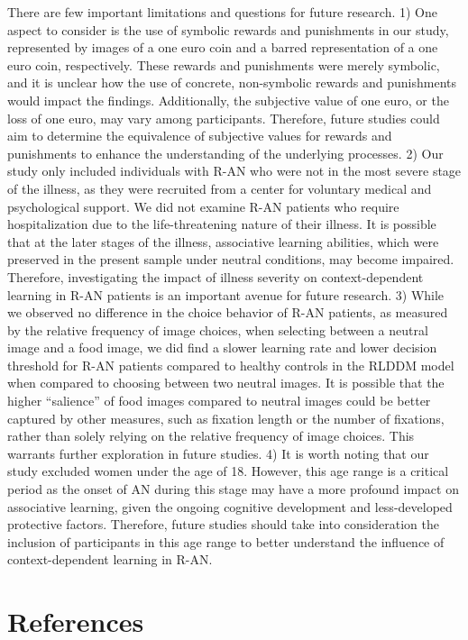 \documentclass[
  man,floatsintext]{apa6}
\begin{document}
There are few important limitations and questions for future research. 1) One aspect to consider is the use of symbolic rewards and punishments in our study, represented by images of a one euro coin and a barred representation of a one euro coin, respectively. These rewards and punishments were merely symbolic, and it is unclear how the use of concrete, non-symbolic rewards and punishments would impact the findings. Additionally, the subjective value of one euro, or the loss of one euro, may vary among participants. Therefore, future studies could aim to determine the equivalence of subjective values for rewards and punishments to enhance the understanding of the underlying processes. 2) Our study only included individuals with R-AN who were not in the most severe stage of the illness, as they were recruited from a center for voluntary medical and psychological support. We did not examine R-AN patients who require hospitalization due to the life-threatening nature of their illness. It is possible that at the later stages of the illness, associative learning abilities, which were preserved in the present sample under neutral conditions, may become impaired. Therefore, investigating the impact of illness severity on context-dependent learning in R-AN patients is an important avenue for future research. 3) While we observed no difference in the choice behavior of R-AN patients, as measured by the relative frequency of image choices, when selecting between a neutral image and a food image, we did find a slower learning rate and lower decision threshold for R-AN patients compared to healthy controls in the RLDDM model when compared to choosing between two neutral images. It is possible that the higher ``salience'' of food images compared to neutral images could be better captured by other measures, such as fixation length or the number of fixations, rather than solely relying on the relative frequency of image choices. This warrants further exploration in future studies. 4) It is worth noting that our study excluded women under the age of 18. However, this age range is a critical period as the onset of AN during this stage may have a more profound impact on associative learning, given the ongoing cognitive development and less-developed protective factors. Therefore, future studies should take into consideration the inclusion of participants in this age range to better understand the influence of context-dependent learning in R-AN.

\newpage

\hypertarget{references}{%
\section{References}\label{references}}
\end{document}
